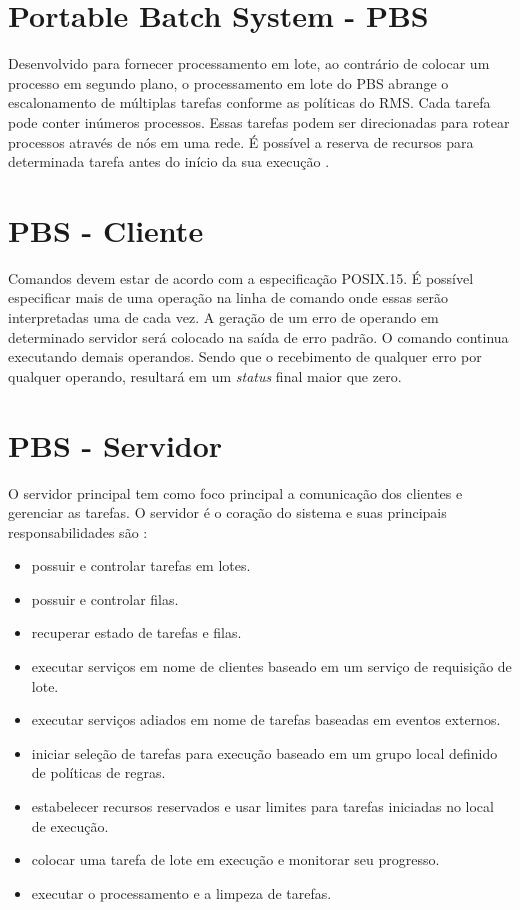 \section{Portable Batch System - PBS}

Desenvolvido para fornecer processamento em lote, ao contrário de colocar um processo em segundo plano, o processamento em lote do PBS abrange o escalonamento de múltiplas tarefas conforme as políticas do RMS. Cada tarefa pode conter inúmeros processos. Essas tarefas podem ser direcionadas para rotear processos através de nós em uma rede. É possível a reserva de recursos para determinada tarefa antes do início da sua execução \cite{Bayucan1998a}.

\section{PBS - Cliente}

Comandos devem estar de acordo com a especificação POSIX.15. É possível especificar mais de uma operação na linha de comando onde essas serão interpretadas uma de cada vez. A geração de um erro de operando em determinado servidor será colocado na saída de erro padrão. O comando continua executando demais operandos. Sendo que o recebimento de qualquer erro por qualquer operando, resultará em um \emph{status} final maior que zero.

\section{PBS - Servidor}

O servidor principal tem como foco principal a comunicação dos clientes e gerenciar as tarefas. O servidor é o coração do sistema e suas principais responsabilidades são \cite{Bayucan1998a}:

\begin{itemize}
	\item possuir e controlar tarefas em lotes.
	\item possuir e controlar filas.
	\item recuperar estado de tarefas e filas.
	\item executar serviços em nome de clientes baseado em um serviço de requisição de lote.
	\item executar serviços adiados em nome de tarefas baseadas em eventos externos.
	\item iniciar seleção de tarefas para execução baseado em um grupo local definido de políticas de regras.
	\item estabelecer recursos reservados e usar limites para tarefas iniciadas no local de execução.
	\item colocar uma tarefa de lote em execução e monitorar seu progresso.
	\item executar o processamento e a limpeza de tarefas.
\end{itemize}

